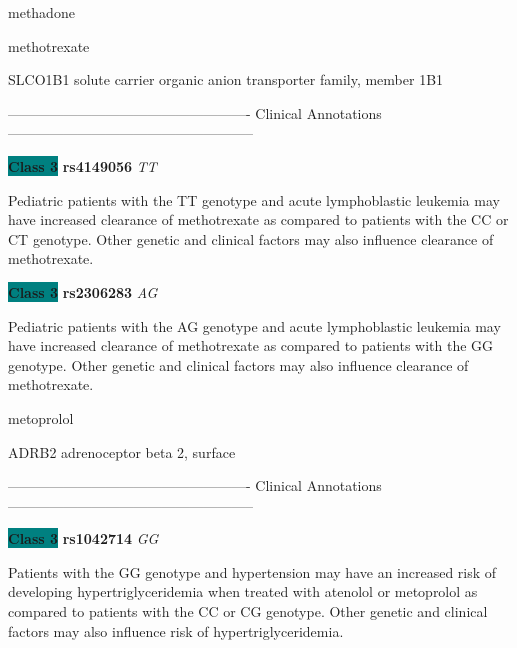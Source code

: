 \documentclass{resume} %
\begin{document}
\begin{rSection}{ methadone }
\end{rSection}\begin{rSection}{ methotrexate }
\item[]

\begin{rSubsection}{ SLCO1B1 }{ solute carrier organic anion transporter family, member 1B1 }{}{}
\item[]

\item[] ---------------------------------------------------- Clinical Annotations -----------------------------------------------------\newline
\item \textbf{\colorbox{teal} {Class 3}} \textbf{ rs4149056 } \textit{ TT }
\item[] Pediatric patients with the TT genotype and acute lymphoblastic leukemia may have increased clearance of methotrexate as compared to patients with the CC or CT genotype. Other genetic and clinical factors may also influence clearance of methotrexate.\item \textbf{\colorbox{teal} {Class 3}} \textbf{ rs2306283 } \textit{ AG }
\item[] Pediatric patients with the AG genotype and acute lymphoblastic leukemia may have increased clearance of methotrexate as compared to patients with the GG genotype. Other genetic and clinical factors may also influence clearance of methotrexate. 
\end{rSubsection}

\end{rSection}\begin{rSection}{ metoprolol }
\item[]

\begin{rSubsection}{ ADRB2 }{ adrenoceptor beta 2, surface }{}{}
\item[]

\item[] ---------------------------------------------------- Clinical Annotations -----------------------------------------------------\newline
\item \textbf{\colorbox{teal} {Class 3}} \textbf{ rs1042714 } \textit{ GG }
\item[] Patients with the GG genotype and hypertension may have an increased risk of developing hypertriglyceridemia when treated with atenolol or metoprolol as compared to patients with the CC or CG genotype. Other genetic and clinical factors may also influence risk of hypertriglyceridemia. 
\end{rSubsection}


\end{rSection}
\end{document}
